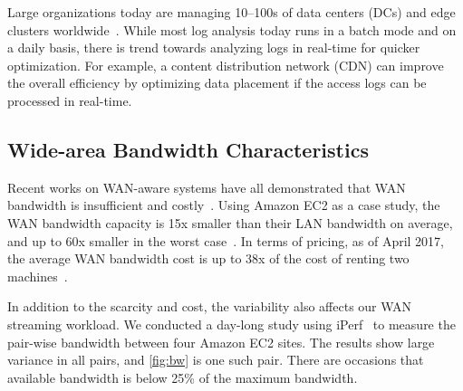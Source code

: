 
 Large organizations today are managing
10--100s of data centers (DCs) and edge clusters
worldwide~\cite{calder2013mapping}. While most log analysis today runs in a
batch mode and on a daily basis, there is trend towards analyzing logs in
real-time for quicker optimization. For example, a content distribution network
(CDN) can improve the overall efficiency by optimizing data placement if the
access logs can be processed in real-time.


\subsection{Wide-area Bandwidth Characteristics}
\label{sec:wide-area-bandwidth}

Recent works on WAN-aware systems have all demonstrated that WAN bandwidth is
insufficient and costly~\cite{pu2015low, vulimiri2015global,
  vulimiri2015wananlytics, hsieh17gaia}. Using Amazon EC2 as a case study, the
WAN bandwidth capacity is 15x smaller than their LAN bandwidth on average, and
up to 60x smaller in the worst case~\cite{hsieh17gaia}. In terms of pricing, as
of April 2017, the average WAN bandwidth cost is up to 38x of the cost of
renting two machines~\cite{amazon2017pricing}.

In addition to the scarcity and cost, the variability also affects our WAN
streaming workload. We conducted a day-long study using iPerf~\cite{iperf3} to
measure the pair-wise bandwidth between four Amazon EC2 sites. The results show
large variance in all pairs, and \autoref{fig:bw} is one such pair. There are
occasions that available bandwidth is below 25\% of the maximum bandwidth.

